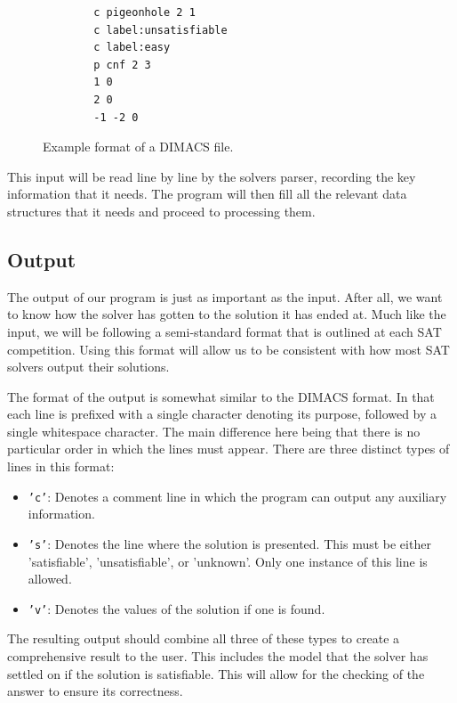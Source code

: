 \documentclass{article}
\begin{document}
\begin{figure}[h]
    \centering
    \begin{lstlisting}
        c pigeonhole 2 1
        c label:unsatisfiable
        c label:easy
        p cnf 2 3
        1 0
        2 0
        -1 -2 0
    \end{lstlisting}
    \caption{Example format of a DIMACS file.}
\end{figure}


This input will be read line by line by the solvers parser, recording the key information that it
needs. The program will then fill all the relevant data structures that it needs and proceed to processing them.

\subsection{Output}
The output of our program is just as important as the input. After all, we want to know how the
solver has gotten to the solution it has ended at. Much like the input, we will be following a
semi-standard format that is outlined at each SAT competition. Using this format will allow us to be
consistent with how most SAT solvers output their solutions.

The format of the output is somewhat similar to the DIMACS format. In that each line is prefixed
with a single character denoting its purpose, followed by a single whitespace character. The main
difference here being that there is no particular order in which the lines must appear. There are
three distinct types of lines in this format:

\begin{itemize}
    \item \texttt{'c'}: Denotes a comment line in which the program can output any auxiliary
          information.
    \item \texttt{'s'}: Denotes the line where the solution is presented. This must be either
          'satisfiable', 'unsatisfiable', or 'unknown'. Only one instance of this line is allowed.
    \item \texttt{'v'}: Denotes the values of the solution if one is found.
\end{itemize}

The resulting output should combine all three of these types to create a comprehensive result to the
user. This includes the model that the solver has settled on if the solution is satisfiable. This
will allow for the checking of the answer to ensure its correctness.
\end{document}
